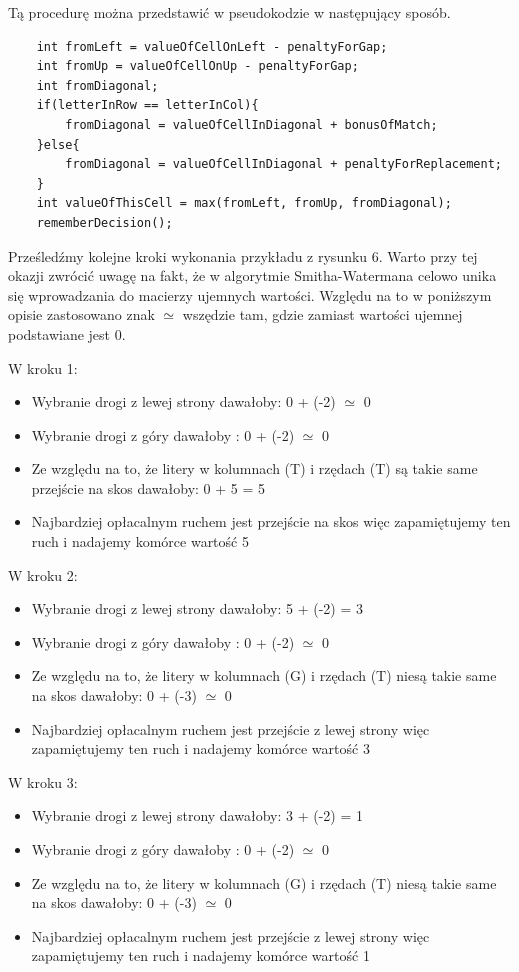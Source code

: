 \documentclass[a4paper,12pt]{article}
\newenvironment{lista}{
\begin{itemize}
  \setlength{\itemsep}{1pt}
  \setlength{\parskip}{0pt}
  \setlength{\parsep}{0pt}
}{\end{itemize}}
\begin{document}
Tą procedurę można przedstawić w pseudokodzie w następujący sposób. 

\begin{lstlisting}
	int fromLeft = valueOfCellOnLeft - penaltyForGap;
	int fromUp = valueOfCellOnUp - penaltyForGap;
	int fromDiagonal;
	if(letterInRow == letterInCol){
		fromDiagonal = valueOfCellInDiagonal + bonusOfMatch;
	}else{
		fromDiagonal = valueOfCellInDiagonal + penaltyForReplacement;
	}
	int	valueOfThisCell = max(fromLeft, fromUp, fromDiagonal);
	rememberDecision();
\end{lstlisting}

Prześledźmy kolejne kroki wykonania przykładu z rysunku 6. Warto przy tej okazji zwrócić uwagę na fakt, że w algorytmie Smitha-Watermana celowo unika się wprowadzania do macierzy ujemnych wartości. Względu na to w poniższym opisie zastosowano znak $\simeq$ wszędzie tam, gdzie zamiast wartości ujemnej podstawiane jest 0.

W kroku 1:
\begin{lista}
\item Wybranie drogi z lewej strony dawałoby: 0 + (-2) $\simeq$ 0
\item Wybranie drogi z góry dawałoby : 0 + (-2) $\simeq$ 0
\item Ze względu na to, że litery w kolumnach (T) i rzędach (T) są takie same przejście na skos dawałoby: 0 + 5 = 5
\item Najbardziej opłacalnym ruchem jest przejście na skos więc zapamiętujemy ten ruch i nadajemy komórce wartość 5
\end{lista}

W kroku 2:
\begin{lista}
\item Wybranie drogi z lewej strony dawałoby: 5 + (-2) = 3
\item Wybranie drogi z góry dawałoby : 0 + (-2) $\simeq$ 0
\item Ze względu na to, że litery w kolumnach (G) i rzędach (T) niesą takie same na skos dawałoby: 0 + (-3) $\simeq$ 0
\item Najbardziej opłacalnym ruchem jest przejście z lewej strony więc zapamiętujemy ten ruch i nadajemy komórce wartość 3
\end{lista}

W kroku 3:
\begin{lista}
\item Wybranie drogi z lewej strony dawałoby: 3 + (-2) = 1
\item Wybranie drogi z góry dawałoby : 0 + (-2) $\simeq$ 0
\item Ze względu na to, że litery w kolumnach (G) i rzędach (T) niesą takie same na skos dawałoby: 0 + (-3) $\simeq$ 0
\item Najbardziej opłacalnym ruchem jest przejście z lewej strony więc zapamiętujemy ten ruch i nadajemy komórce wartość 1
\end{lista}
\end{document}
